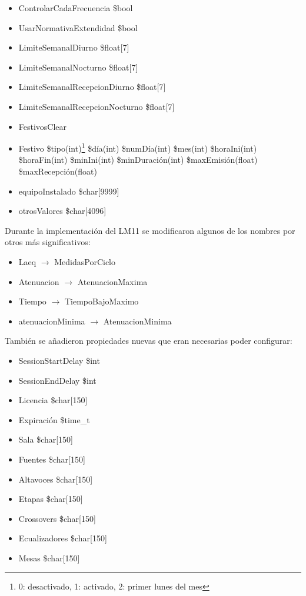 \begin{itemize}
	\item ControlarCadaFrecuencia \$bool
	\item UsarNormativaExtendidad \$bool
	\item LimiteSemanalDiurno \$float[7] 
	\item LimiteSemanalNocturno \$float[7] 
	\item LimiteSemanalRecepcionDiurno \$float[7] 
	\item LimiteSemanalRecepcionNocturno \$float[7] 
	\item FestivosClear
	\item Festivo \$tipo(int)\footnote{0: desactivado, 1: activado, 2: primer lunes del mes} \$día(int) \$numDía(int) \$mes(int) \$horaIni(int) \$horaFin(int) \$minIni(int) \$minDuración(int) \$maxEmisión(float) \$maxRecepción(float)
	\item equipoInstalado \$char[9999]
	\item otrosValores \$char[4096]
\end{itemize}

Durante la implementación del LM11 se modificaron algunos de los nombres por otros más significativos:
\begin{itemize}
	\item Laeq $\rightarrow$ MedidasPorCiclo
	\item Atenuacion $\rightarrow$ AtenuacionMaxima
	\item Tiempo $\rightarrow$ TiempoBajoMaximo
	\item atenuacionMinima $\rightarrow$ AtenuacionMinima
\end{itemize}

También se añadieron propiedades nuevas que eran necesarias poder configurar:
\begin{multicols}{2}
\begin{itemize}
	\item SessionStartDelay \$int
	\item SessionEndDelay \$int
	\item Licencia \$char[150]
	\item Expiración \$time\_t
	\item Sala \$char[150]
	\item Fuentes \$char[150]
	\item Altavoces \$char[150]
	\item Etapas \$char[150]
	\item Crossovers \$char[150]
	\item Ecualizadores \$char[150]
	\item Mesas \$char[150]
\end{itemize}
\end{multicols}

